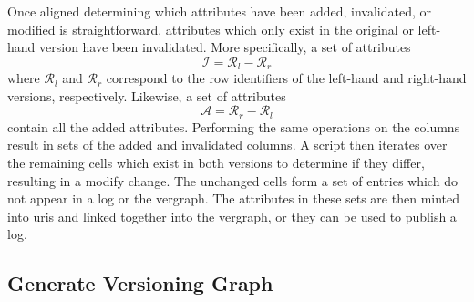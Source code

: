 Once aligned determining which attributes have been added, invalidated, or modified is straightforward.
\Glspl{attribute} which only exist in the original or left-hand \gls{version} have been invalidated.
More specifically, a set of \glspl{attribute} \[\mathcal{I} = \mathcal{R}_{l} - \mathcal{R}_{r}\] where \(\mathcal{R}_{l}\) and \(\mathcal{R}_{r}\) correspond to the row identifiers of the left-hand and right-hand \glspl{version}, respectively.
Likewise, a set of \glspl{attribute} \[\mathcal{A} = \mathcal{R}_{r} - \mathcal{R}_{l}\] contain all the added \glspl{attribute}.
Performing the same operations on the columns result in sets of the added and invalidated columns.
A script then iterates over the remaining cells which exist in both \glspl{version} to determine if they differ, resulting in a \gls{modify} \gls{change}.
The unchanged cells form a set of entries which do not appear in a \gls{log} or the \gls{vergraph}.
The \glspl{attribute} in these sets are then minted into \glspl{uri} and linked together into the \gls{vergraph}, or they can be used to publish a \gls{log}.

\subsection{Generate Versioning Graph}

